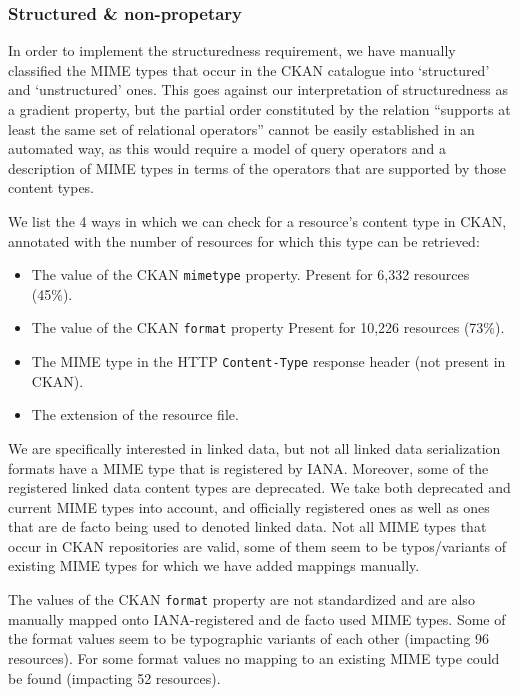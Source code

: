 \subsubsection*{Structured \& non-propetary}
\label{sec:implementation_mime}

In order to implement the structuredness requirement,
 we have manually classified the MIME types that occur in the CKAN catalogue
 into `structured' and `unstructured' ones.
This goes against our interpretation of structuredness as
 a gradient property, but the partial order constituted by the relation
 ``supports at least the same set of relational operators''
 cannot be easily established in an automated way,
 as this would require a model of query operators
 and a description of MIME types in terms of the operators that are
 supported by those content types.

We list the 4 ways in which we can check for a resource's content type
 in CKAN, annotated with the number of resources for which
 this type can be retrieved:
\begin{itemize}[noitemsep,nolistsep]
  \item The value of the CKAN \texttt{mimetype} property.
        Present for 6,332 resources (45\%).
  \item The value of the CKAN \texttt{format} property
        Present for 10,226 resources (73\%).
  \item The MIME type in the HTTP \texttt{Content-Type} response header
         (not present in CKAN).
  \item The extension of the resource file.
\end{itemize}

We are specifically interested in linked data,
 but not all linked data serialization formats have a MIME type
 that is registered by IANA.
Moreover, some of the registered linked data content types are deprecated.
We take both deprecated and current MIME types into account,
 and officially registered ones as well as ones that are
 de facto being used to denoted linked data.
Not all MIME types that occur in CKAN repositories are valid,
 some of them seem to be typos/variants of existing MIME types
 for which we have added mappings manually.

The values of the CKAN \texttt{format} property are not standardized
 and are also manually mapped onto IANA-registered and de facto used
 MIME types.
Some of the format values seem to be typographic variants
 of each other (impacting 96 resources).
For some format values no mapping to an existing MIME type
 could be found (impacting 52 resources).

